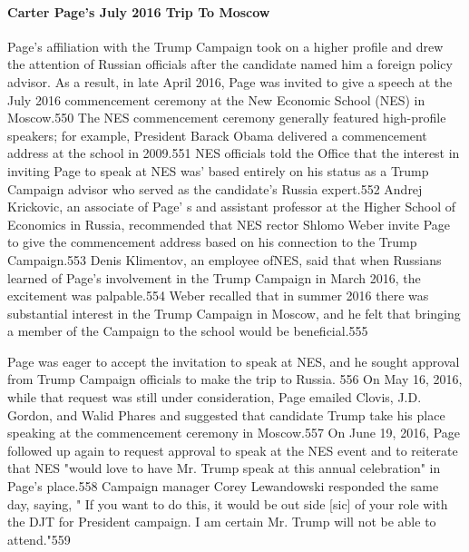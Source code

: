 \paragraph{Carter Page's July 2016 Trip To Moscow}

Page's affiliation with the Trump Campaign took on a higher profile and drew the attention of Russian officials after the candidate named him a  foreign policy advisor. As a  result, in late April 2016, Page was invited to give a speech at the July 2016 commencement ceremony at the New Economic School (NES) in Moscow.550 The NES commencement ceremony generally featured high-profile speakers; for example, President Barack Obama delivered a commencement address at the school in 2009.551 NES officials told the Office that the interest in inviting Page to speak at NES was' based entirely on his status as a  Trump Campaign advisor who served as the candidate's  Russia expert.552 Andrej Krickovic, an associate of Page' s and assistant professor at the Higher School of Economics in Russia, recommended that NES rector Shlomo Weber invite Page to give the commencement address based on his connection to the Trump Campaign.553 Denis Klimentov, an employee ofNES, said that when Russians learned of Page's involvement in the Trump Campaign in March 2016, the excitement was palpable.554 Weber recalled that in summer 2016 there was substantial interest in the Trump Campaign in Moscow, and he felt that bringing a member of the Campaign to the school would be beneficial.555

Page was eager to accept the invitation to speak at NES, and he sought approval from Trump Campaign officials to make the trip to Russia. 556 On May 16, 2016, while that request was still under consideration, Page emailed Clovis, J.D. Gordon, and Walid Phares and suggested that candidate Trump take his place speaking at the commencement ceremony in Moscow.557 On June 19, 2016, Page followed up again to request approval to speak at the NES event and to reiterate that NES "would love to have Mr. Trump speak at this annual celebration" in Page's place.558 Campaign manager Corey Lewandowski responded the same day, saying, " If you want to do this, it would be out side [sic] of your role with the DJT for President campaign. I  am certain Mr. Trump will not be able to attend."559

